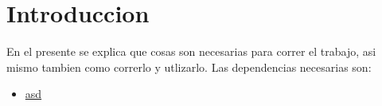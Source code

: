 



\def\verObs{0}


\setmainfont{AvenirLTStd-Roman}



\setmainfont{Calibri}




\section{Introduccion}
En el presente se explica que cosas son necesarias para correr el trabajo, asi mismo tambien como correrlo y utlizarlo.
Las dependencias necesarias son:
\begin{itemize}
\item \href{https://petercorke.com/toolboxes/robotics-toolbox/}{asd}
\end{itemize}
